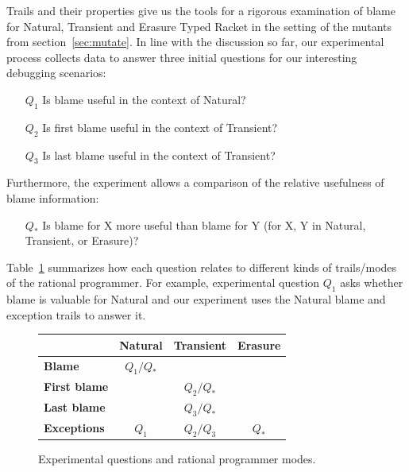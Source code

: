 
Trails and their properties give us the tools for a rigorous examination
of blame for Natural, Transient and Erasure Typed Racket in the setting of the 
mutants from section~\ref{sec:mutate}. In line with the discussion so far, 
our experimental process collects data to answer three initial questions
for our interesting debugging scenarios:
\begin{itemize}
\item[$Q_1$] Is blame useful in the context of Natural?

\item[$Q_2$] Is first blame useful in the context of Transient?

\item[$Q_3$] Is last blame useful in the context of Transient?

\end{itemize}

Furthermore, the experiment allows a comparison of the relative usefulness of blame
information:
\begin{itemize}
\item[$Q_*$] Is blame for X more useful than blame for Y (for X, Y in Natural, Transient, or Erasure)?
\end{itemize}


Table~\ref{fig:experiment-outline} summarizes how each question relates to
different kinds of trails/modes of the rational programmer. For example, experimental
question $Q_1$ asks whether blame is valuable for Natural and our experiment
uses the Natural blame and exception trails to answer it.

\begin{figure}[ht]
\center
{\begin{tabular}{l|c|c|c}
                        & {\bf Natural}  & {\bf Transient} &  {\bf Erasure} \\ \hline 
{\bf Blame}             &  $Q_1/Q_*$    &                  &                \\
{\bf First blame}       &               &     $Q_2/Q_*$    &                 \\
{\bf Last blame}        &               &     $Q_3/Q_*$    &                 \\
{\bf Exceptions}        &      $Q_1$    &     $Q_2/Q_3$    &      $Q_*$      \\
\end{tabular}}
  \caption{ Experimental questions and rational programmer modes.}
  \label{fig:experiment-outline}
\end{figure}

